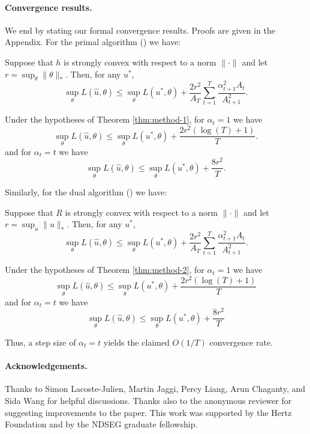 \documentclass{article} %
\begin{document}
\paragraph{Convergence results.}
We end by stating our formal convergence results. Proofs are given in the Appendix. For the primal algorithm 
(\primal) we have:
\begin{theorem}
\label{thm:method-1}
Suppose that $h$ is strongly convex with respect to a norm $\|\cdot\|$ 
and let $r = \sup_{\theta} \|\theta\|_{*}$. Then, for any $u^*$,
\[ \sup_{\theta} L(\hat{u}, \theta) \leq \sup_{\theta} L(u^*, \theta) + \frac{2r^2}{A_T} \sum_{t=1}^T \frac{\alpha_{t+1}^2A_t}{A_{t+1}^2}. \]
\end{theorem}
\begin{corollary} 
\label{cor:method-1}
Under the hypotheses of Theorem \ref{thm:method-1}, for $\alpha_{t} = 1$ we have
\[ \sup_{\theta} L(\hat{u}, \theta) \leq \sup_{\theta} L(u^*, \theta) + \frac{2r^2 (\log (T) + 1)}{T}. \]
and for $\alpha_t = t$ we have
\[ \sup_{\theta} L(\hat{u}, \theta) \leq \sup_{\theta} L(u^*, \theta) + \frac{8r^2}{T}. \]
\end{corollary}
Similarly, for the dual algorithm (\dual) we have:
\begin{theorem}
\label{thm:method-2}
Suppose that $R$ is strongly convex with respect to a norm $\|\cdot\|$ 
and let $r = \sup_{u} \|u\|_{*}$. Then, for any $u^*$,
\[ \sup_{\theta} L(\hat{u}, \theta) \leq \sup_{\theta} L(u^*, \theta) + \frac{2r^2}{A_T} \sum_{t=1}^T \frac{\alpha_{t+1}^2A_t}{A_{t+1}^2}. \]
\end{theorem}
\begin{corollary}
\label{cor:method-2}
Under the hypotheses of Theorem \ref{thm:method-2}, for $\alpha_t = 1$ we have
\[ \sup_{\theta} L(\hat{u}, \theta) \leq \sup_{\theta} L(u^*, \theta) + \frac{2r^2(\log(T) + 1)}{T} \]
and for $\alpha_t = t$ we have
\[ \sup_{\theta} L(\hat{u}, \theta) \leq \sup_{\theta} L(u^*, \theta) + \frac{8r^2}{T} \]
\end{corollary}
Thus, a step size of $\alpha_t = t$ yields the claimed $O(1/T)$ convergence rate.

\paragraph{Acknowledgements.}
Thanks to Simon Lacoste-Julien, Martin Jaggi, Percy Liang, Arun Chaganty, and Sida Wang 
for helpful discussions. Thanks also to the anonymous reviewer for suggesting improvements 
to the paper. This work was supported by the Hertz Foundation and by the NDSEG graduate 
fellowship.
\end{document}
